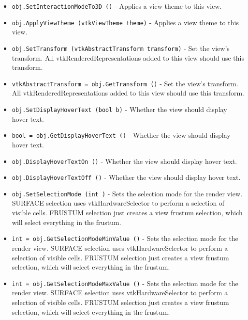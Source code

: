 \begin{itemize}
\item  \verb|obj.SetInteractionModeTo3D ()| -  Applies a view theme to this view.

\item  \verb|obj.ApplyViewTheme (vtkViewTheme theme)| -  Applies a view theme to this view.

\item  \verb|obj.SetTransform (vtkAbstractTransform transform)| -  Set the view's transform. All vtkRenderedRepresentations
 added to this view should use this transform.

\item  \verb|vtkAbstractTransform = obj.GetTransform ()| -  Set the view's transform. All vtkRenderedRepresentations
 added to this view should use this transform.

\item  \verb|obj.SetDisplayHoverText (bool b)| -  Whether the view should display hover text.

\item  \verb|bool = obj.GetDisplayHoverText ()| -  Whether the view should display hover text.

\item  \verb|obj.DisplayHoverTextOn ()| -  Whether the view should display hover text.

\item  \verb|obj.DisplayHoverTextOff ()| -  Whether the view should display hover text.

\item  \verb|obj.SetSelectionMode (int )| -  Sets the selection mode for the render view.
 SURFACE selection uses vtkHardwareSelector to perform a selection
 of visible cells.
 FRUSTUM selection just creates a view frustum selection, which will
 select everything in the frustum.

\item  \verb|int = obj.GetSelectionModeMinValue ()| -  Sets the selection mode for the render view.
 SURFACE selection uses vtkHardwareSelector to perform a selection
 of visible cells.
 FRUSTUM selection just creates a view frustum selection, which will
 select everything in the frustum.

\item  \verb|int = obj.GetSelectionModeMaxValue ()| -  Sets the selection mode for the render view.
 SURFACE selection uses vtkHardwareSelector to perform a selection
 of visible cells.
 FRUSTUM selection just creates a view frustum selection, which will
 select everything in the frustum.


\end{itemize}
